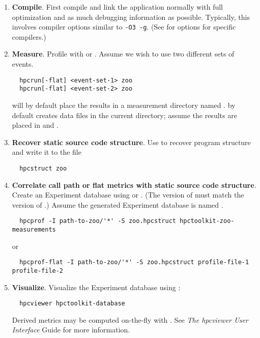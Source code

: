 \documentclass[english]{article}
\begin{document}
\begin{enumerate}

\item \textbf{Compile}.
First compile and link the application normally with full optimization and as much debugging information as possible.
Typically, this involves compiler options similar to \verb+-O3 -g+.
(See  for options for specific compilers.)

\item \textbf{Measure}.
Profile with  or .
Assume we wish to use two different sets of events.
\begin{verbatim}
  hpcrun[-flat] <event-set-1> zoo
  hpcrun[-flat] <event-set-2> zoo
\end{verbatim}
 will by default place the results in a measurement directory named .
 by default creates data files in the current directory; assume the results are placed in  and .

\item \textbf{Recover static source code structure}. 
Use  to recover program structure and write it to the file 
\begin{verbatim}
  hpcstruct zoo
\end{verbatim}

\item \textbf{Correlate call path or flat metrics with static source code structure}.
Create an Experiment database using  or .  (The version of  must match the version of .)
Assume the generated Experiment database is named .
\begin{verbatim}
  hpcprof -I path-to-zoo/'*' -S zoo.hpcstruct hpctoolkit-zoo-measurements
\end{verbatim}
or
\begin{verbatim}
  hpcprof-flat -I path-to-zoo/'*' -S zoo.hpcstruct profile-file-1 profile-file-2
\end{verbatim}

\item \textbf{Visualize}.
Visualize the Experiment database using :
\begin{verbatim}
  hpcviewer hpctoolkit-database
\end{verbatim}
Derived metrics may be computed on-the-fly with .
See \emph{The hpcviewer User Interface} Guide for more information.

\end{enumerate}
\end{document}
